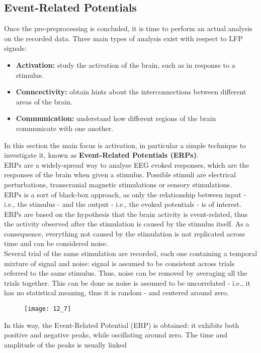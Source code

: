 \subsection{Event-Related Potentials}
Once the pre-preprocessing is concluded, it is time to perform an actual analysis on the
recorded data. Three main types of analysis exist with respect to LFP signals:
\begin{itemize}
    \item \textbf{Activation:} study the activation of the brain, such as in response to a stimulus.
    \item \textbf{Conncectivity:} obtain hints about the interconnections between different
          areas of the brain.
    \item \textbf{Communication:} understand how different regions of the brain communicate
          with one another.
\end{itemize}
In this section the main focus is activation, in particular a simple technique to investigate
it, known as \textbf{Event-Related Potentials (ERPs)}.\\
ERPs are a widely-spread way to analyse EEG evoked responses, which are the responses of the brain
when given a stimulus. Possible stimuli are electrical perturbations, transcranial magnetic stimulations
or sensory stimulations.\\
ERPs is a sort of black-box approach, as only the relationship between
input - i.e., the stimulus - and the output - i.e., the evoked potentials - is of interest.
ERPs are based on the hypothesis that the brain activity is event-related, thus the activity
observed after the stimulation is caused by the stimulus itself. As a consequence, everything
not caused by the stimulation is not replicated across time and can be considered noise.\\
Several trial of the same stimulation are recorded, each one containing a temporal mixture
of signal and noise: signal is assumed to be consistent across trials referred to the same
stimulus. Thus, noise can be removed by averaging all the trials together. This can be done
as noise is assumed to be uncorrelated - i.e., it has no statistical meaning, thus it is random -
and centered around zero.
\begin{figure}[H]
    \centering
    \texttt{[image: 12\_7]}
\end{figure}
In this way, the Event-Related Potential (ERP) is obtained: it exhibits both positive and negative
peaks, while oscillating around zero. The time and amplitude of the peaks is usually linked
